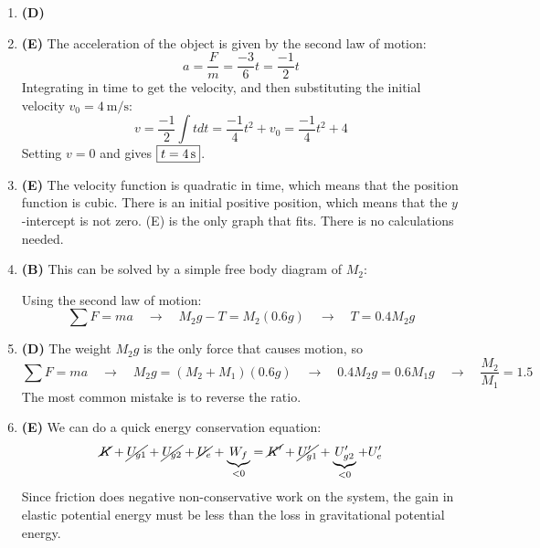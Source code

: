 \documentclass{../../oss-handout}
\begin{document}
\begin{enumerate}[leftmargin=17pt]
\item\textbf{(D)}
  
\item\textbf{(E)} The acceleration of the object is given by the second law of
  motion:
  \begin{displaymath}
    a=\frac Fm=\frac{-3}6t=\frac{-1}2t
  \end{displaymath}
  Integrating in time to get the velocity, and then substituting the initial
  velocity $v_0=\SI{4}{\metre\per\second}$:
  \begin{displaymath}
    v=\frac{-1}2\int tdt=\frac{-1}4t^2+v_0=\frac{-1}4t^2+4
  \end{displaymath}
  Setting $v=0$ and gives $\boxed{t=\SI4{\second}}$.

\item\textbf{(E)} The velocity function is quadratic in time, which means that
  the position function is cubic. There is an initial positive position, which
  means that the $y$-intercept is not zero. (E) is the only graph that fits.
  There is no calculations needed.
  \newpage
  
\item\textbf{(B)} This can be solved by a simple free body diagram of $M_2$:
  \begin{center}
  \end{center}
  Using the second law of motion:
  \begin{displaymath}
    \sum F=ma\quad\longrightarrow\quad
    M_2g-T=M_2(0.6g)\quad\longrightarrow\quad T=\boxed{0.4M_2g}
  \end{displaymath}

\item\textbf{(D)} The weight $M_2g$ is the only force that causes motion, so
  \begin{displaymath}
    \sum F=ma\quad\longrightarrow\quad
    M_2g=(M_2+M_1)(0.6g)\quad\longrightarrow\quad
    0.4M_2g=0.6M_1g\quad\longrightarrow\quad
    \frac{M_2}{M_1}=\boxed{1.5}
  \end{displaymath}
  The most common mistake is to reverse the ratio.

\item\textbf{(E)} We can do a quick energy conservation equation:
  \begin{displaymath}
    \cancel{K} +\cancel{U_{g1}} +\cancel{U_{g2}}+\cancel{U_e}+
    \underbrace{W_f}_{<0}=
    \cancel{K'}+\cancel{U_{g1}'}+\underbrace{U_{g2}'}_{<0}+U_e'
  \end{displaymath}
  Since friction does negative non-conservative work on the system, the gain
  in elastic potential energy must be less than the loss in gravitational
  potential energy.
  

\end{enumerate}
\end{document}
